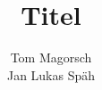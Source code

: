 \documentclass[aspectratio=1610, 9pt]{beamer}
\title{Titel}
\author[T.~Magorsch,~J.~L.~Späh]{Tom Magorsch\\ Jan Lukas Späh}
\institute[ML-Seminar]{\\[0.3cm]TU Dortmund \\ \Large ML-Seminar}
\begin{document}
\maketitle

\begin{frame}
  \parencite{test}
\end{frame}
\end{document}
